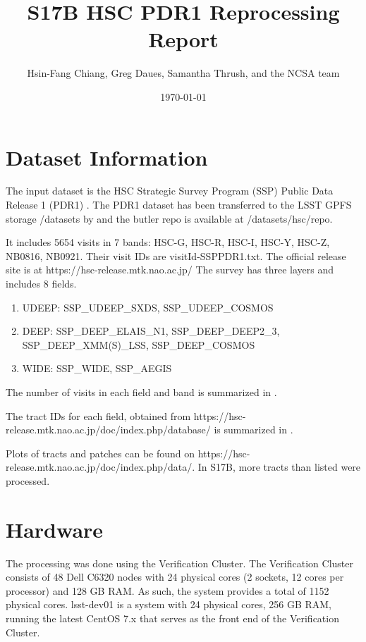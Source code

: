 \documentclass[DM,authoryear,toc]{lsstdoc}
\title{S17B HSC PDR1 Reprocessing Report}
\author{%
Hsin-Fang Chiang, Greg Daues, Samantha Thrush, and the NCSA team
}
\date{\today}
\begin{document}
\maketitle

\section{Dataset Information}
The input dataset is the HSC Strategic Survey Program (SSP) Public Data Release 1 (PDR1) \citep{2017arXiv170208449A}.
The PDR1 dataset has been transferred to the LSST GPFS storage /datasets by  and the butler repo is available at /datasets/hsc/repo.

It includes 5654 visits in 7 bands: HSC-G, HSC-R, HSC-I, HSC-Y, HSC-Z, NB0816, NB0921. Their visit IDs are visitId-SSPPDR1.txt.  The official release site is at https://hsc-release.mtk.nao.ac.jp/
The survey has three layers and includes 8 fields.
\begin{enumerate}
\item
UDEEP: SSP{\_}UDEEP{\_}SXDS, SSP{\_}UDEEP{\_}COSMOS
\item
DEEP: SSP{\_}DEEP{\_}ELAIS{\_}N1, SSP{\_}DEEP{\_}DEEP2{\_}3, SSP{\_}DEEP{\_}XMM(S){\_}LSS, SSP{\_}DEEP{\_}COSMOS
\item
WIDE: SSP{\_}WIDE, SSP{\_}AEGIS
\end{enumerate}

The number of visits in each field and band is summarized in .



The tract IDs for each field, obtained
from https://hsc-release.mtk.nao.ac.jp/doc/index.php/database/
is summarized in .



Plots of tracts and patches can be found on  https://hsc-release.mtk.nao.ac.jp/doc/index.php/data/. In S17B, more tracts than listed were processed.

\section{Hardware}
The processing was done using the Verification Cluster.
The Verification Cluster consists of 48 Dell C6320 nodes with 24 physical cores (2 sockets, 12 cores per processor) and 128 GB RAM. As such, the system provides a total of 1152 physical cores.
lsst-dev01 is a system with 24 physical cores, 256 GB RAM, running the latest CentOS 7.x that serves as the front end of the Verification Cluster.
\end{document}
